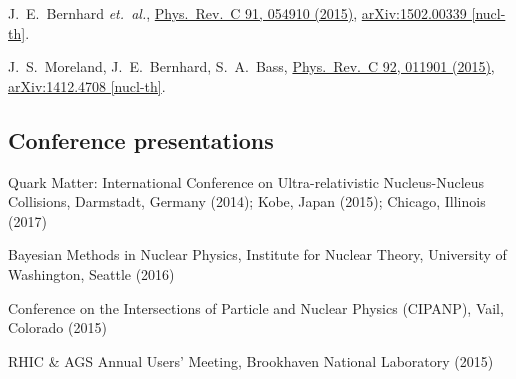 \documentclass[letterpaper,10pt]{article}
\begin{document}
\begin{multicols}{2}
J.~E.~Bernhard \textit{et.\ al.},
\href{https://journals.aps.org/prc/abstract/10.1103/PhysRevC.91.054910}{Phys.\ Rev.\ C 91, 054910 (2015)},
\href{https://arxiv.org/abs/1502.00339}{arXiv:1502.00339 [nucl-th]}.

J.~S.~Moreland, J.~E.~Bernhard, S.~A.~Bass,
\href{https://journals.aps.org/prc/abstract/10.1103/PhysRevC.92.011901}{Phys.\ Rev.\ C 92, 011901 (2015)},
\href{https://arxiv.org/abs/1412.4708}{arXiv:1412.4708 [nucl-th]}.

\subsection{Conference presentations}

Quark Matter: International Conference on Ultra-relativistic Nucleus-Nucleus Collisions, Darmstadt, Germany (2014); Kobe, Japan (2015); Chicago, Illinois (2017)

Bayesian Methods in Nuclear Physics, Institute for Nuclear Theory, University of Washington, Seattle (2016)

Conference on the Intersections of Particle and Nuclear Physics (CIPANP), Vail, Colorado (2015)

RHIC \& AGS Annual Users' Meeting, Brookhaven National Laboratory (2015)


\end{multicols}
\end{document}
